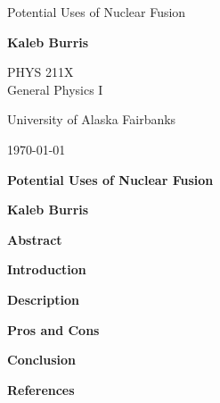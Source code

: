 \documentclass[12pt]{article}
\begin{document}
    \begin{titlepage}
        \begin{center}
            {\Huge Potential Uses of Nuclear Fusion}

            \vspace{1.5cm}

            \large \textbf{Kaleb Burris}

            \vfill

            \Large PHYS 211X \\ General Physics I

            \large University of Alaska Fairbanks
            
            \today
        \end{center}
    \end{titlepage}

    \thispagestyle{plain}

    \begin{center}
        \Large \textbf{Potential Uses of Nuclear Fusion}

        \large \textbf{Kaleb Burris}

        \vspace{0.75cm}

        \textbf{Abstract}
    \end{center}

    \lipsum[1-2]

    \pagebreak

    \begin{center}
        \large \textbf{Introduction}
    \end{center}

    \lipsum[3-5]

    \pagebreak

    \begin{center}
        \large \textbf{Description}
    \end{center}

    \lipsum[6-10]

    \pagebreak

    \begin{center}
        \large \textbf{Pros and Cons}
    \end{center}

    \lipsum[11-15]

    \pagebreak

    \begin{center}
        \large \textbf{Conclusion}
    \end{center}

    \lipsum[16-20]

    \pagebreak

    \begin{center}
        \large \textbf{References}
    \end{center}

    
    
\end{document}
